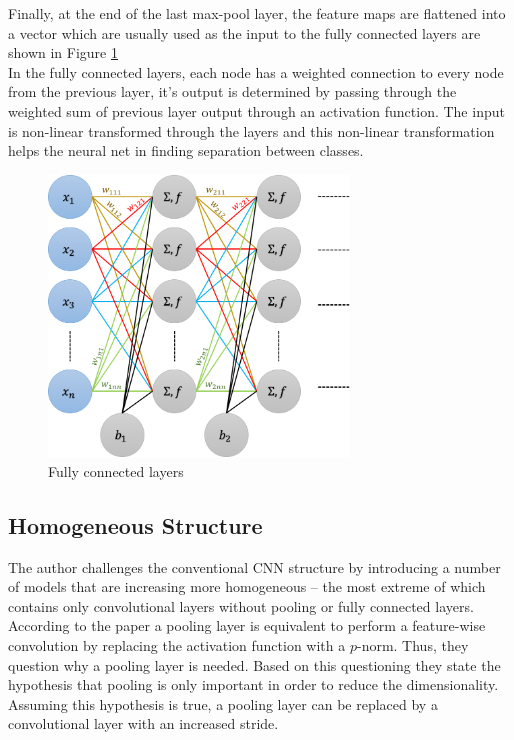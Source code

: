 Finally, at the end of the last max-pool layer, the feature maps are flattened into a vector which are usually used as the input to the fully connected layers are shown in Figure \ref{fig:fullyconnected}\\
In the fully connected layers, each node has a weighted connection to every node from the previous layer, it's output is determined by passing through the weighted sum of previous layer output through an activation function. The input is non-linear transformed through the layers and this non-linear transformation helps the neural net in finding separation between classes.\\
\begin{figure}[hb]
	\includegraphics[width = 8cm]{img/fullyconnected.png}
    \caption{\label{fig:fullyconnected}
    Fully connected layers}
\end{figure}

\subsection{Homogeneous Structure}
The author challenges the conventional CNN structure by introducing a number of models that are increasing more homogeneous -- the most extreme of which contains only convolutional layers without pooling or fully connected layers.
According to the paper a pooling layer is equivalent to perform a feature-wise convolution by replacing the activation function with a $p$-norm. Thus, they question why a pooling layer is needed. Based on this questioning
they state the hypothesis that pooling is only important in order to reduce the dimensionality. Assuming this hypothesis is true, a pooling layer can be replaced by
a convolutional layer with an increased stride.

